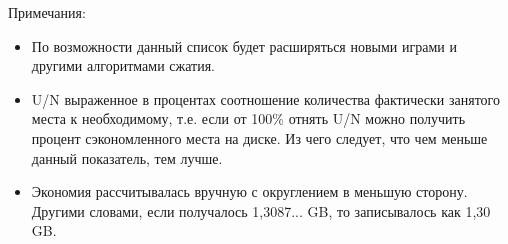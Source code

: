 \documentclass[letterpaper,10pt,russian,openany]{sphinxmanual}
\begin{document}
\sphinxAtStartPar
Примечания:
\begin{itemize}
\item {} 
\sphinxAtStartPar
По возможности данный список будет расширяться новыми играми и другими алгоритмами сжатия.

\item {} 
\sphinxAtStartPar
U/N \sphinxhyphen{} выраженное в процентах соотношение количества фактически занятого места к необходимому,
т.е. если от 100\% отнять U/N можно получить процент сэкономленного места на диске. Из чего следует, что чем меньше данный показатель, тем лучше.

\item {} 
\sphinxAtStartPar
Экономия рассчитывалась вручную с округлением в меньшую сторону. Другими словами, если получалось 1,3087... GB, то записывалось как 1,30 GB.

\end{itemize}

\ignorespaces 
\end{document}
